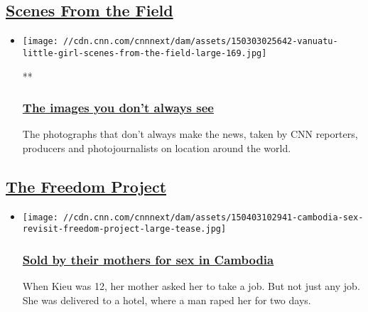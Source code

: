 \hypertarget{scenes-from-the-field-}{%
\subsection{\texorpdfstring{\href{/2013/11/05/world/gallery/scenes-from-the-field/index.html}{Scenes
From the
Field}~}{Scenes From the Field~}}\label{scenes-from-the-field-}}

\begin{itemize}
\item
  \href{/2013/11/05/world/gallery/scenes-from-the-field/index.html}{}

  \texttt{[image: //cdn.cnn.com/cnnnext/dam/assets/150303025642-vanuatu-little-girl-scenes-from-the-field-large-169.jpg]}

  **

  \hypertarget{the-images-you-dont-always-see}{%
  \subsubsection{\texorpdfstring{\href{/2013/11/05/world/gallery/scenes-from-the-field/index.html}{The
  images you don't always
  see}}{The images you don't always see}}\label{the-images-you-dont-always-see}}

  The photographs that don't always make the news, taken by CNN
  reporters, producers and photojournalists on location around the
  world.
\end{itemize}

\hypertarget{the-freedom-project-}{%
\subsection{\texorpdfstring{\href{http://thecnnfreedomproject.blogs.cnn.com/}{The
Freedom Project}~}{The Freedom Project~}}\label{the-freedom-project-}}

\begin{itemize}
\item
  \href{/2015/04/03/world/cambodia-child-sex-trafficking/index.html}{}

  \texttt{[image: //cdn.cnn.com/cnnnext/dam/assets/150403102941-cambodia-sex-revisit-freedom-project-large-tease.jpg]}

  \hypertarget{sold-by-their-mothers-for-sex-in-cambodia}{%
  \subsubsection{\texorpdfstring{\href{/2015/04/03/world/cambodia-child-sex-trafficking/index.html}{Sold
  by their mothers for sex in
  Cambodia}}{Sold by their mothers for sex in Cambodia}}\label{sold-by-their-mothers-for-sex-in-cambodia}}

  When Kieu was 12, her mother asked her to take a job. But not just any
  job. She was delivered to a hotel, where a man raped her for two days.
\end{itemize}

